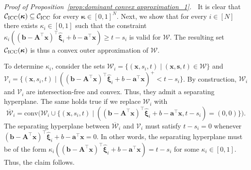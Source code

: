 \documentclass[nonblindrev]{informs2017}
\newcommand{\bmh}[1]{\hat{\bm{#1}}}
\newcommand{\1}[1]{\mathds{1}{\left(#1\right)}}
\begin{document}
%


\noindent \emph{Proof of Proposition~\ref{prop:dominant convex approximation_1}.} $\;$
It is clear that $\mathcal{C}_{\rm ICC} (\bm{\kappa}) \subseteq \mathcal{C}_{\rm ICC}$ for every $\bm{\kappa} \in[0,1]^N$. Next, we show that for every $i \in [N]$ there exists $\kappa_i \in [0, 1]$ such that the constraint
$\kappa_i ((\bm{b} - \bm{A}^\top\bm{x})^\top\bmh{\xi}_i + b - \bm{a}^\top\bm{x}) \geq t - s_i$ is valid for $\mathcal{W}$. The resulting set $\mathcal{C}_{\rm ICC}(\bm{\kappa})$ is thus a convex outer approximation of $\mathcal{W}$.

To determine $\kappa_i$, consider the sets
$\mathcal{W}_i = \{(\bm{x}, s_i, t) \mid (\bm{x}, \bm{s}, t) \in \mathcal{W}\}$
and $\mathcal{V}_i = \{(\bm{x}, s_i, t) \mid ((\bm{b} - \bm{A}^\top\bm{x})^\top\bmh{\xi}_i + b - \bm{a}^\top\bm{x})^+ < t - s_i\}$.
By construction, $\mathcal{W}_i$ and $\mathcal{V}_i$ are intersection-free and convex. Thus, they admit a separating hyperplane. The same holds true if we replace $\mathcal{W}_i$ with
$$
\overline{\mathcal{W}}_i = \text{conv} \big(\mathcal{W}_i \cup \{(\bm{x}, s_i, t) \mid ((\bm{b} - \bm{A}^\top\bm{x})^\top\bmh{\xi}_i + b - \bm{a}^\top\bm{x}, t - s_i) = (0, 0)\}\big).
$$
The separating hyperplane between $\overline{\mathcal{W}}_i$ and $\mathcal{V}_i$ must satisfy $t - s_i = 0$ whenever $(\bm{b} - \bm{A}^\top\bm{x})^\top\bmh{\xi}_i + b - \bm{a}^\top\bm{x} = 0$. In other words, the separating hyperplane must be of the form $\kappa_i((\bm{b} - \bm{A}^\top\bm{x})^\top\bmh{\xi}_i + b - \bm{a}^\top\bm{x}) = t - s_i$ for some $\kappa_i\in [0,1]$. Thus, the claim follows.
\hfill \Halmos
\endproof
\end{document}
